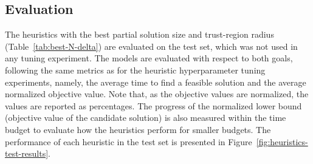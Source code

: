 \subsection{Evaluation}

The heuristics with the best partial solution size and trust-region radius (Table~\ref{tab:best-N-delta}) are evaluated on the test set, which was not used in any tuning experiment.
The models are evaluated with respect to both goals, following the same metrics as for the heuristic hyperparameter tuning experiments, namely, the average time to find a feasible solution and the average normalized objective value.
Note that, as the objective values are normalized, the values are reported as percentages.
The progress of the normalized lower bound (objective value of the candidate solution) is also measured within the time budget to evaluate how the heuristics perform for smaller budgets.
The performance of each heuristic in the test set is presented in Figure~\ref{fig:heuristics-test-results}.

